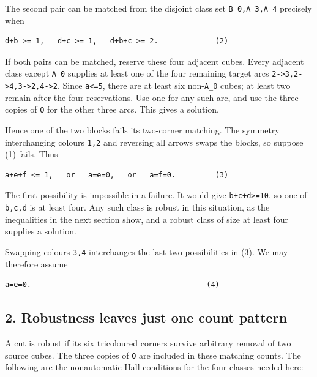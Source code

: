 \documentclass[
  10pt,
]{article}
\begin{document}
The second pair can be matched from the disjoint class set
\texttt{B\_0,A\_3,A\_4} precisely when

\begin{verbatim}
d+b >= 1,   d+c >= 1,   d+b+c >= 2.             (2)
\end{verbatim}

If both pairs can be matched, reserve these four adjacent cubes. Every
adjacent class except \texttt{A\_0} supplies at least one of the four
remaining target arcs
\texttt{2-\textgreater{}3,2-\textgreater{}4,3-\textgreater{}2,4-\textgreater{}2}.
Since \texttt{a\textless{}=5}, there are at least six non-\texttt{A\_0}
cubes; at least two remain after the four reservations. Use one for any
such arc, and use the three copies of \texttt{O} for the other three
arcs. This gives a solution.

Hence one of the two blocks fails its two-corner matching. The symmetry
interchanging colours \texttt{1,2} and reversing all arrows swaps the
blocks, so suppose (1) fails. Thus

\begin{verbatim}
a+e+f <= 1,   or   a=e=0,   or   a=f=0.         (3)
\end{verbatim}

The first possibility is impossible in a failure. It would give
\texttt{b+c+d\textgreater{}=10}, so one of \texttt{b,c,d} is at least
four. Any such class is robust in this situation, as the inequalities in
the next section show, and a robust class of size at least four supplies
a solution.

Swapping colours \texttt{3,4} interchanges the last two possibilities in
(3). We may therefore assume

\begin{verbatim}
a=e=0.                                        (4)
\end{verbatim}

\hypertarget{robustness-leaves-just-one-count-pattern}{%
\subsection*{2. Robustness leaves just one count
pattern}\label{robustness-leaves-just-one-count-pattern}}

A cut is robust if its six tricoloured corners survive arbitrary removal
of two source cubes. The three copies of \texttt{O} are included in
these matching counts. The following are the nonautomatic Hall
conditions for the four classes needed here:
\end{document}

